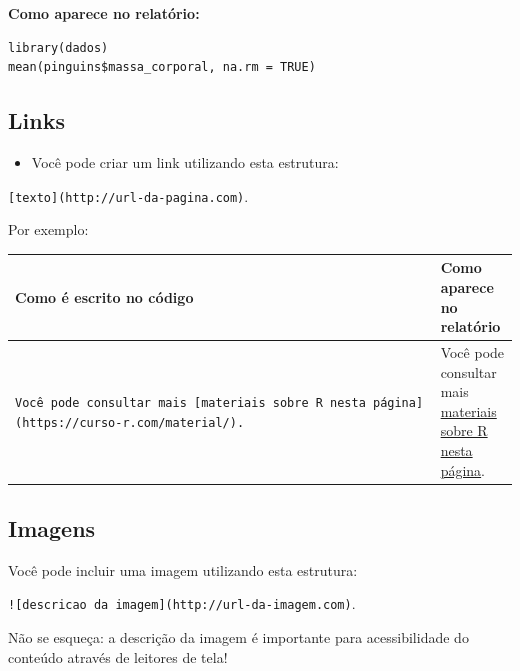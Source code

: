 \documentclass[
]{book}
\providecommand{\tightlist}{%
  \setlength{\itemsep}{0pt}\setlength{\parskip}{0pt}}
\begin{document}
\textbf{Como aparece no relatório:}

\begin{verbatim}
library(dados)
mean(pinguins$massa_corporal, na.rm = TRUE)
\end{verbatim}

\hypertarget{links}{%
\subsection{Links}\label{links}}

\begin{itemize}
\tightlist
\item
  Você pode criar um link utilizando esta estrutura:
\end{itemize}

\texttt{{[}texto{]}(http://url-da-pagina.com)}.

Por exemplo:

\begin{longtable}[]{@{}
  >{\raggedleft\arraybackslash}p{}
  >{\raggedleft\arraybackslash}p{}@{}}
\toprule
Como é escrito no código & Como aparece no relatório \\
\midrule
\endhead
\texttt{Você\ pode\ consultar\ mais\ {[}materiais\ sobre\ R\ nesta\ página{]}(https://curso-r.com/material/).} & Você pode consultar mais \href{https://curso-r.com/material/}{materiais sobre R nesta página}. \\
\bottomrule
\end{longtable}

\hypertarget{imagens}{%
\subsection{Imagens}\label{imagens}}

Você pode incluir uma imagem utilizando esta estrutura:

\texttt{!{[}descricao\ da\ imagem{]}(http://url-da-imagem.com)}.

Não se esqueça: a descrição da imagem é importante para
acessibilidade do conteúdo através de leitores de tela!
\end{document}
